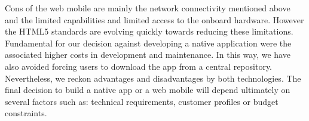 \documentclass[11pt,twoside]{article}
\begin{document}
Cons of the web mobile are mainly the network connectivity mentioned
above and the limited capabilities and limited access to the onboard
hardware. However the HTML5 standards are evolving quickly towards
reducing these limitations. Fundamental for our decision against
developing a native application were the associated higher costs in
development and maintenance. In this way, we have also avoided forcing
users to download the app from a central repository.\\

Nevertheless, we reckon advantages and disadvantages by both
technologies. The final decision to build a native app or a web mobile
will depend ultimately on several factors such as: technical
requirements, customer profiles or budget constraints.


\end{document}
